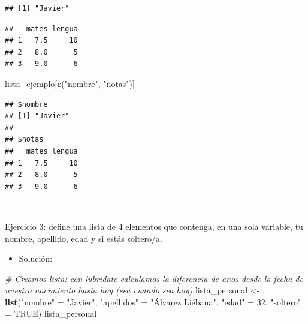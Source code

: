 \documentclass[11pt,]{book}
\newenvironment{Shaded}{\begin{snugshade}}{\end{snugshade}}
\newcommand{\CommentTok}[1]{\textcolor[rgb]{0.37,0.37,0.37}{\textit{#1}}}
\newcommand{\DecValTok}[1]{\textcolor[rgb]{0.06,0.06,0.06}{#1}}
\newcommand{\KeywordTok}[1]{\textcolor[rgb]{0.27,0.27,0.27}{\textbf{#1}}}
\newcommand{\NormalTok}[1]{#1}
\newcommand{\OperatorTok}[1]{\textcolor[rgb]{0.43,0.43,0.43}{\textbf{#1}}}
\newcommand{\OtherTok}[1]{\textcolor[rgb]{0.37,0.37,0.37}{#1}}
\newcommand{\StringTok}[1]{\textcolor[rgb]{0.5,0.5,0.5}{#1}}
\providecommand{\tightlist}{%
  \setlength{\itemsep}{0pt}\setlength{\parskip}{0pt}}
\begin{document}
\begin{verbatim}
## [1] "Javier"
\end{verbatim}

\begin{Shaded}
\end{Shaded}

\begin{verbatim}
##   mates lengua
## 1   7.5     10
## 2   8.0      5
## 3   9.0      6
\end{verbatim}

\begin{Shaded}
\begin{Highlighting}[]
\NormalTok{lista_ejemplo[}\KeywordTok{c}\NormalTok{(}\StringTok{"nombre"}\NormalTok{, }\StringTok{"notas"}\NormalTok{)]}
\end{Highlighting}
\end{Shaded}

\begin{verbatim}
## $nombre
## [1] "Javier"
## 
## $notas
##   mates lengua
## 1   7.5     10
## 2   8.0      5
## 3   9.0      6
\end{verbatim}

~

Ejercicio 3: define una lista de 4 elementos que contenga, en una sola variable, tu nombre, apellido, edad y si estás soltero/a.

\begin{itemize}
\tightlist
\item
  Solución:
\end{itemize}

\begin{Shaded}
\begin{Highlighting}[]
\CommentTok{# Creamos lista: con lubridate calculamos la diferencia de años desde la fecha de nuestro nacimiento hasta hoy (sea cuando sea hoy)}
\NormalTok{lista_personal <-}\StringTok{ }\KeywordTok{list}\NormalTok{(}\StringTok{"nombre"}\NormalTok{ =}\StringTok{ "Javier"}\NormalTok{,}
                       \StringTok{"apellidos"}\NormalTok{ =}\StringTok{ "Álvarez Liébana"}\NormalTok{,}
                       \StringTok{"edad"}\NormalTok{ =}\StringTok{ }\DecValTok{32}\NormalTok{,}
                       \StringTok{"soltero"}\NormalTok{ =}\StringTok{ }\OtherTok{TRUE}\NormalTok{)}
\NormalTok{lista_personal}
\end{Highlighting}
\end{Shaded}
\end{document}
